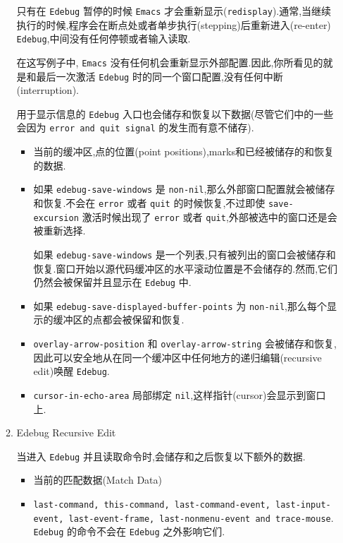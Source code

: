 \documentclass[11pt]{article}
\begin{document}
\begin{enumerate}
\begin{enumerate}
只有在 \texttt{Edebug} 暂停的时候 \texttt{Emacs} 才会重新显示(\texttt{redisplay}).通常,当继续执行的时候,程序会在断点处或者单步执行(stepping)后重新进入(re-enter) \texttt{Edebug},中间没有任何停顿或者输入读取.

在这写例子中, \texttt{Emacs} 没有任何机会重新显示外部配置.因此,你所看见的就是和最后一次激活 \texttt{Edebug} 时的同一个窗口配置,没有任何中断(interruption).

用于显示信息的 \texttt{Edebug} 入口也会储存和恢复以下数据(尽管它们中的一些会因为 \texttt{error and quit signal} 的发生而有意不储存).

\begin{itemize}
\item 当前的缓冲区,点的位置(point positions),marks和已经被储存的和恢复的数据.

\item 如果 \texttt{edebug-save-windows} 是 \texttt{non-nil},那么外部窗口配置就会被储存和恢复.不会在 \texttt{error} 或者 \texttt{quit} 的时候恢复,不过即使 \texttt{save-excursion} 激活时候出现了 \texttt{error} 或者 \texttt{quit},外部被选中的窗口还是会被重新选择.

如果 \texttt{edebug-save-windows} 是一个列表,只有被列出的窗口会被储存和恢复.窗口开始以源代码缓冲区的水平滚动位置是不会储存的.然而,它们仍然会被保留并且显示在 \texttt{Edebug} 中.

\item 如果 \texttt{edebug-save-displayed-buffer-points} 为 \texttt{non-nil},那么每个显示的缓冲区的点都会被保留和恢复.

\item \texttt{overlay-arrow-position} 和 \texttt{overlay-arrow-string} 会被储存和恢复,因此可以安全地从在同一个缓冲区中任何地方的递归编辑(recursive edit)唤醒 \texttt{Edebug}.

\item \texttt{cursor-in-echo-area} 局部绑定 \texttt{nil},这样指针(cursor)会显示到窗口上.
\end{itemize}

\item Edebug Recursive Edit
\label{sec:org2de2ce5}

当进入 \texttt{Edebug} 并且读取命令时,会储存和之后恢复以下额外的数据.

\begin{itemize}
\item 当前的匹配数据(Match Data)

\item \texttt{last-command, this-command, last-command-event, last-input-event, last-event-frame, last-nonmenu-event and trace-mouse}. \texttt{Edebug} 的命令不会在 \texttt{Edebug} 之外影响它们.


\end{itemize}
\end{enumerate}
\end{enumerate}
\end{document}
